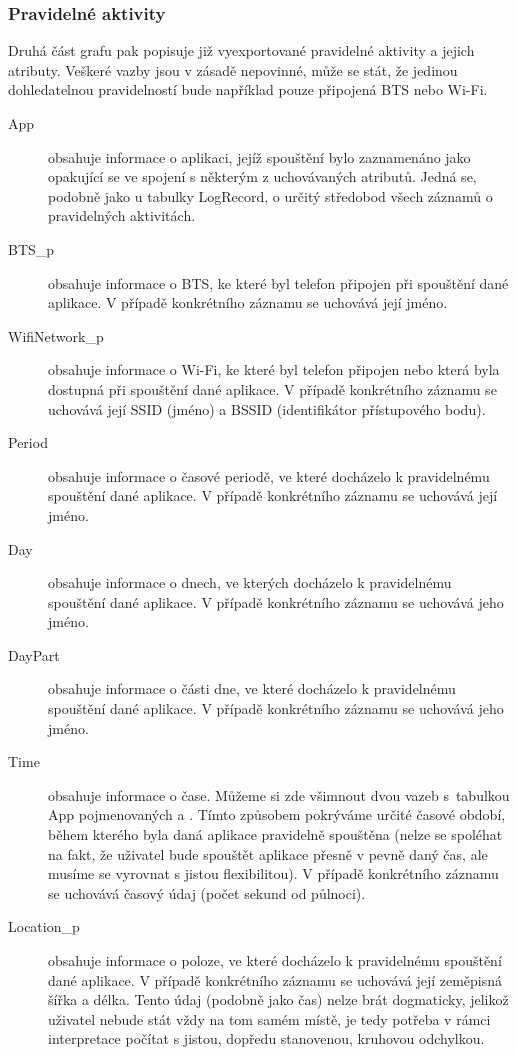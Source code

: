 \documentclass[thesis=M,czech]{FITthesis}[2012/06/26]
\begin{document}
\subsubsection*{Pravidelné aktivity}
Druhá část grafu pak popisuje již vyexportované pravidelné aktivity a jejich atributy. Veškeré vazby jsou v zásadě nepovinné, může se stát, že jedinou dohledatelnou pravidelností bude například pouze připojená BTS nebo Wi-Fi.

\begin{description}
\item[App]
obsahuje informace o aplikaci, jejíž spouštění bylo zaznamenáno jako opakující se ve spojení s některým z uchovávaných atributů. Jedná se, podobně jako u tabulky LogRecord, o určitý středobod všech záznamů o pravidelných aktivitách.

\item[BTS\_p]
obsahuje informace o BTS, ke které byl telefon připojen při spouštění dané aplikace. V případě konkrétního záznamu se uchovává její jméno.

\item[WifiNetwork\_p]
obsahuje informace o Wi-Fi, ke které byl telefon připojen nebo která byla dostupná při spouštění dané aplikace. V případě konkrétního záznamu se uchovává její SSID (jméno) a BSSID (identifikátor přístupového bodu).

\item[Period]
obsahuje informace o časové periodě, ve které docházelo k pravidelnému spouštění dané aplikace. V případě konkrétního záznamu se uchovává její jméno.

\item[Day]
obsahuje informace o dnech, ve kterých docházelo k pravidelnému spouštění dané aplikace. V případě konkrétního záznamu se uchovává jeho jméno.

\item[DayPart]
obsahuje informace o části dne, ve které docházelo k pravidelnému spouštění dané aplikace. V případě konkrétního záznamu se uchovává jeho jméno.

\item[Time]
obsahuje informace o čase. Můžeme si zde všimnout dvou vazeb s~tabulkou App pojmenovaných  a . Tímto způsobem pokrýváme určité časové období, během kterého byla daná aplikace pravidelně spouštěna (nelze se spoléhat na fakt, že uživatel bude spouštět aplikace přesně v pevně daný čas, ale musíme se vyrovnat s jistou flexibilitou). V případě konkrétního záznamu se uchovává časový údaj (počet sekund od půlnoci).

\item[Location\_p]
obsahuje informace o poloze, ve které docházelo k pravidelnému spouštění dané aplikace. V případě konkrétního záznamu se uchovává její zeměpisná šířka a délka. Tento údaj (podobně jako čas) nelze brát dogmaticky, jelikož uživatel nebude stát vždy na tom samém místě, je tedy potřeba v rámci interpretace počítat s jistou, dopředu stanovenou, kruhovou odchylkou.
\end{description}
\end{document}
